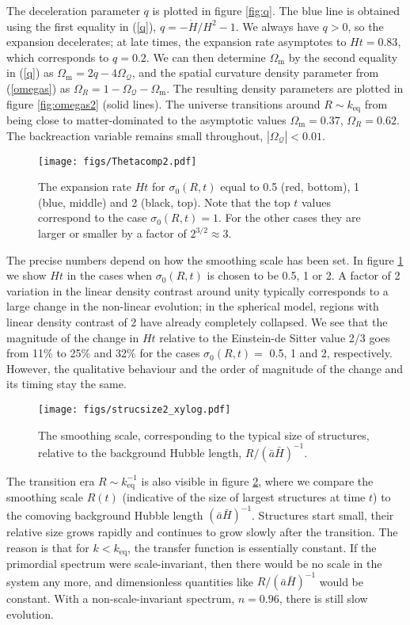 \documentclass[11pt, a4paper]{article}
\newcommand{\re}[1]{(\ref{#1})}
\newcommand{\fig}[1]{figure \ref{#1}}
\newcommand{\keq}{k_{\mathrm{eq}}}
\newcommand{\Hdot}{\dot{H}}
\newcommand{\sQ}{\mathcal{Q}}
\newcommand{\Om}{\Omega_{\mathrm{m}}}
\newcommand{\OQ}{\Omega_{\sQ}}
\newcommand{\OR}{\Omega_{R}}
\begin{document}
The deceleration parameter $q$ is plotted in \fig{fig:q}. The blue
line is obtained using the first equality in \re{q},
$q=-\Hdot/H^2-1$. We always have $q>0$, so the expansion decelerates;
at late times, the expansion rate asymptotes to $Ht=0.83$, which
corresponds to $q=0.2$. We can then determine $\Om$ by the second
equality in \re{q} as $\Om=2q-4\OQ$, and the spatial curvature density
parameter from \re{omegas} as $\OR=1-\OQ-\Om$. The resulting density
parameters are plotted in \fig{fig:omegas2} (solid lines). The
universe transitions around $R\sim\keq$ from being close to
matter-dominated to the asymptotic values $\Om=0.37$, $\OR=0.62$. The
backreaction variable remains small throughout, $|\OQ|<0.01$.
\begin{figure}[t]
  \centering
  \texttt{[image: figs/Thetacomp2.pdf]} \\
  \caption{The expansion rate $Ht$ for $\sigma_0(R,t)$ equal to 0.5
    (red, bottom), 1 (blue, middle) and 2 (black, top). Note that the top $t$ values correspond to the case $\sigma_0(R,t)=1$. For the other cases they are larger or smaller by a factor of $2^{3/2}\approx3$.}
  \label{fig:difRHt}
\end{figure}

The precise numbers depend on how the smoothing scale has been set. In
\fig{fig:difRHt} we show $Ht$ in the cases when $\sigma_0(R,t)$ is
chosen to be 0.5, 1 or 2. A factor of 2 variation in the linear
density contrast around unity typically corresponds to a large change
in the non-linear evolution; in the spherical model, regions with
linear density contrast of 2 have already completely collapsed. We see
that the magnitude of the change in $Ht$ relative to the Einstein-de
Sitter value 2/3 goes from 11\% to 25\% and 32\% for the cases
$\sigma_0(R,t)=$ 0.5, 1 and 2, respectively. However, the qualitative
behaviour and the order of magnitude of the change and its timing stay
the same.

\begin{figure}[t]
  \centering
  \texttt{[image: figs/strucsize2\_xylog.pdf]} \\
  \caption{The smoothing scale, corresponding to the typical size of
    structures, relative to the background Hubble length,
    $R/(\bar a \bar H)^{-1}$.}
  \label{fig:scale}
\end{figure}

The transition era $R\sim\keq^{-1}$ is also visible in
\fig{fig:scale}, where we compare the smoothing scale $R(t)$
(indicative of the size of largest structures at time $t$) to the
comoving background Hubble length $(\bar a \bar H)^{-1}$. Structures
start small, their relative size grows rapidly and continues to grow
slowly after the transition. The reason is that for $k<\keq$, the transfer function is essentially constant. If the
primordial spectrum were scale-invariant, then there would be no scale
in the system any more, and dimensionless quantities like
$R/(\bar a \bar H)^{-1}$ would be constant. With a non-scale-invariant
spectrum, $n=0.96$, there is still slow evolution.
\end{document}
